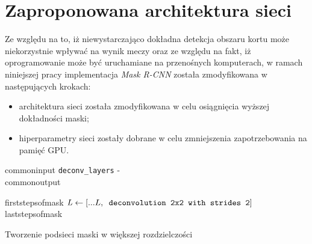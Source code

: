 \newpage
\section{Zaproponowana architektura sieci}
\label{sec:zaproponowana_architektura}

Ze względu na to, iż niewystarczająco dokładna detekcja obszaru kortu może niekorzystnie wpływać na wynik meczy oraz ze względu na fakt, iż oprogramowanie może być uruchamiane na przenośnych komputerach, w ramach niniejszej pracy implementacja \textit{Mask R-CNN} została zmodyfikowana w następujących krokach:

\begin{itemize}
	\item architektura sieci została zmodyfikowana w celu osiągnięcia wyższej dokładności maski;
	\item hiperparametry sieci zostały dobrane w celu zmniejszenia zapotrzebowania na pamięć GPU.
\end{itemize}

\begin{algorithm}
  {commoninput}
  \hspace*{\algorithmicindent} \verb|deconv_layers| - \deconvlayersdescription \\
  {commonoutput}
  \begin{algorithmic}[1]
    {firststepsofmask}
      \State $\mathit{L} \gets [...L,\verb| deconvolution 2x2 with strides 2|]$
    \EndFor
    {laststepsofmask}
	\end{algorithmic}
	\caption{Tworzenie podsieci maski w większej rozdzielczości}
	\label{alg:mask-r-cnn-modified}
\end{algorithm}
